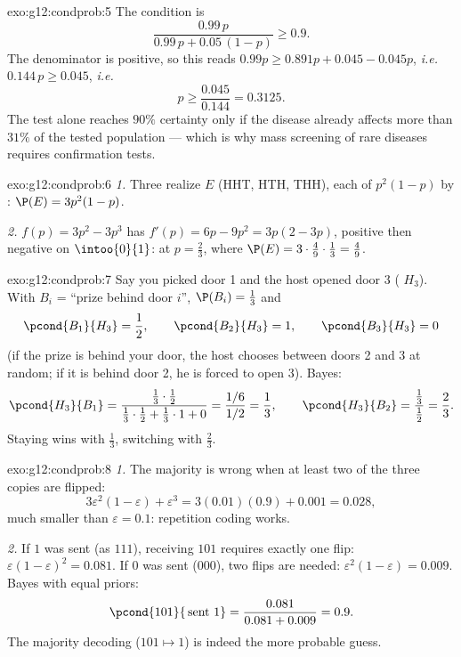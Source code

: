 \begin{solution}{exo:g12:condprob:5}
The condition is
\[
\frac{0.99\,p}{0.99\,p + 0.05\,(1-p)} \geq 0.9 .
\]
The denominator is positive, so this reads
$0.99p \geq 0.891p + 0.045 - 0.045p$, \emph{i.e.} $0.144\,p \geq 0.045$,
\emph{i.e.}
\[
p \geq \frac{0.045}{0.144} = 0.3125 .
\]
The test alone reaches $90\%$ certainty only if the disease already affects
more than $31\%$ of the tested population --- which is why mass screening
of rare diseases requires confirmation tests.
\end{solution}

\begin{solution}{exo:g12:condprob:6}
\emph{1.} Three  realize $E$ (HHT, HTH, THH), each of 
$p^2(1-p)$ by : $\P(E) = 3p^2(1 - p)$.

\emph{2.} $f(p) = 3p^2 - 3p^3$ has $f'(p) = 6p - 9p^2 = 3p(2 - 3p)$,
positive then negative on $\intoo{0}{1}$:  at $p = \frac23$, where
$\P(E) = 3\cdot\frac49\cdot\frac13 = \frac49$.
\end{solution}

\begin{solution}{exo:g12:condprob:7}
Say you picked door 1 and the host opened door 3 ( $H_3$). With
$B_i$ = ``prize behind door $i$'', $\P(B_i) = \frac13$ and
\[
\pcond{B_1}{H_3} = \frac12, \qquad
\pcond{B_2}{H_3} = 1, \qquad
\pcond{B_3}{H_3} = 0
\]
(if the prize is behind your door, the host chooses between doors 2 and 3
at random; if it is behind door 2, he is forced to open 3). Bayes:
\[
\pcond{H_3}{B_1}
= \frac{\frac13\cdot\frac12}{\frac13\cdot\frac12 + \frac13\cdot1 + 0}
= \frac{1/6}{1/2} = \frac13,
\qquad
\pcond{H_3}{B_2} = \frac{\frac13}{\frac12} = \frac23 .
\]
Staying wins with  $\frac13$, switching with 
$\frac23$.
\end{solution}

\begin{solution}{exo:g12:condprob:8}
\emph{1.} The majority is wrong when at least two of the three copies are
flipped:
\[
3\varepsilon^2(1-\varepsilon) + \varepsilon^3
= 3(0.01)(0.9) + 0.001 = 0.028,
\]
much smaller than $\varepsilon = 0.1$: repetition coding works.

\emph{2.} If $1$ was sent (as $111$), receiving $101$ requires exactly one
flip:  $\varepsilon(1-\varepsilon)^2 = 0.081$. If $0$ was sent
($000$), two flips are needed: $\varepsilon^2(1-\varepsilon) = 0.009$.
Bayes with equal priors:
\[
\pcond{101}{\,\text{sent }1} = \frac{0.081}{0.081 + 0.009} = 0.9 .
\]
The majority decoding ($101 \mapsto 1$) is indeed the more probable guess.
\end{solution}

